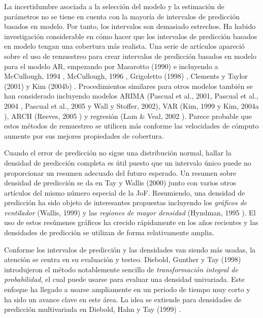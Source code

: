 \documentclass{llncs}
\begin{document}
La incertidumbre asociada a la selección del modelo y la estimación de parámetros no se tiene en cuenta con la mayoría de intervalos de predicción basados en modelo. Por tanto, los intervalos son demasiado estrechos. Ha habido investigación considerable en cómo hacer que los intervalos de predicción basados en modelo tengan una cobertura más realista. Una serie de artículos apareció sobre el uso de remuestreo para crear intervalos de predicción basados en modelo para el modelo AR, empezando por Masarotto (1990) \cite{Masarotto1990229} e incluyendo a McCullough, 1994 \cite{McCullough199451}, McCullough, 1996 \cite{Mccullough1996293}, Grigoletto (1998) \cite{Grigoletto1998447}, Clements y Taylor (2001) \cite{Clements2001247} y Kim (2004b) \cite{Kim200485}. Procedimientos similares para otros modelos también se han considerado incluyendo modelos ARIMA (Pascual et al., 2001\cite{Pascual200183}, Pascual et al., 2004 \cite{Pascual2004449}, Pascual et al., 2005 \cite{Pascual2005219} y Wall y Stoffer, 2002\cite{Wall2002733}), VAR (Kim, 1999 \cite{Kim1999393} y Kim, 2004a \cite{Kim200485}), ARCH (Reeves, 2005 \cite{Reeves2005237}) y regresión (Lam \& Veal, 2002 \cite{Lam2002125}). Parece probable que estos métodos de remuestreo se utilicen más conforme las velocidades de cómputo aumente por sus mejores propiedades de cobertura.

Cuando el error de predicción no sigue una distribución normal, hallar la densidad de predicción completa es útil puesto que un intervalo único puede no proporcionar un resumen adecuado del futuro esperado. Un resumen sobre densidad de predicción se da en Tay y Wallis (2000) \cite{Tay2000235} junto con varios otros artículos del mismo número especial de la JoF. Resumiendo, una densidad de predicción ha sido objeto de interesantes propuestas incluyendo los \emph{gráficos de ventilador}  (Wallis, 1999) \cite{Wallis1999106} y las \emph{regiones de mayor densidad} (Hyndman, 1995 \cite{Hyndman1995431}). El uso de estos resúmenes gráficos ha crecido rápidamente en los años recientes y las densidades de predicción se utilizan de forma relativamente amplia.

Conforme los intervalos de predicción y las densidades van siendo más usadas, la atención se centra en su evaluación y testeo. Diebold, Gunther y Tay (1998) \cite{Diebold1998863} introdujeron el método notablemente sencillo de \emph{transformación integral de probabilidad}, el cual puede usarse para evaluar una densidad univariada. Este enfoque ha llegado a usarse ampliamente en un periodo de tiempo muy corto y ha sido un avance clave en este área. La idea se extiende para densidades de predicción multivariada en Diebold, Hahn y Tay (1999) \cite{Diebold1999661}.
\end{document}
